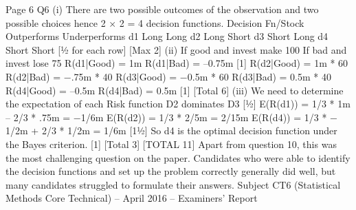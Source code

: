 Page 6
Q6 (i) There are two possible outcomes of the observation and two possible choices
hence 2 × 2 = 4 decision functions.
Decision Fn/Stock Outperforms Underperforms
d1 Long Long
d2 Long Short
d3 Short Long
d4 Short Short
[½ for each row]
[Max 2]
(ii) If good and invest make 100%
If bad and invest lose 75%
R(d1|Good) = 1m
R(d1|Bad) = –0.75m [1]
R(d2|Good) = 1m * 60%
R(d2|Bad) = −.75m * 40%
R(d3|Good) = −0.5m * 60%
R(d3|Bad) = 0.5m * 40%
R(d4|Good) = –0.5m
R(d4|Bad) = 0.5m [1]
[Total 6]
(iii) We need to determine the expectation of each Risk function
D2 dominates D3 [½]
E(R(d1)) = 1/3 * 1m – 2/3 * .75m = −1/6m
E(R(d2)) = 1/3 * 2/5m = 2/15m
E(R(d4)) = 1/3 * − 1/2m + 2/3 * 1/2m = 1/6m [1½]
So d4 is the optimal decision function under the Bayes criterion. [1]
[Total 3]
[TOTAL 11]
Apart from question 10, this was the most challenging question on the paper.
Candidates who were able to identify the decision functions and set up the
problem correctly generally did well, but many candidates struggled to
formulate their answers.
Subject CT6 (Statistical Methods Core Technical) – April 2016 – Examiners’ Report

